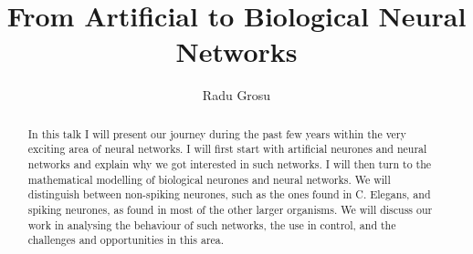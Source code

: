 \documentclass{llncs}
\begin{document}



\title{\bf From Artificial to Biological Neural Networks}


\author{
 Radu Grosu
}


\maketitle

\begin{abstract}
In this talk I will present our journey during the past few 
years within the very exciting area of neural networks. I 
will first start with artificial neurones and neural networks 
and explain why we got interested in such networks. I 
will then turn to the mathematical modelling of biological 
neurones and neural networks. We will distinguish 
between non-spiking neurones, such as the ones found
in C. Elegans, and spiking neurones, as found in most
of the other larger organisms. We will discuss our work
in analysing the behaviour of such networks, the use in
control, and the challenges and opportunities in this area.
\end{abstract}



\end{document}

